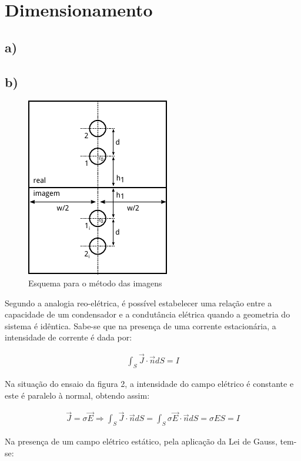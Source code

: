 \documentclass[portuguese, a4paper]{article}
\begin{document}
	\section{Dimensionamento}
	\subsection{a)}

	\subsection{b)}
	\begin{figure}[h]
		\centering
		\includegraphics[width=0.4\linewidth]{imagem.pdf}
		\caption{Esquema para o método das imagens}
		\label{fig:imagem}
	\end{figure}

	\par
	Segundo a analogia reo-elétrica, é possível estabelecer uma relação entre a capacidade de um condensador e a condutância elétrica quando a geometria do sistema é idêntica.
	Sabe-se que na presença de uma corrente estacionária, a intensidade de corrente é dada por:

	\begin{align*}
		\int _ { S } \vec{J} \cdot \vec{n} d S = I
	\end{align*}

	\par
	Na situação do ensaio da figura 2, a intensidade do campo elétrico é constante e este é paralelo à normal, obtendo assim:

	\begin{align*}
		\vec{J} = \sigma \vec{E} \Rightarrow \int _ { S } \vec{J} \cdot \vec{n} d S = \int _ { S } \sigma \vec{E} \cdot \vec{n} d S  = \sigma E S = I
	\end{align*}

	\par
	Na presença de um campo elétrico estático, pela aplicação da Lei de Gauss, tem-se:
\end{document}
